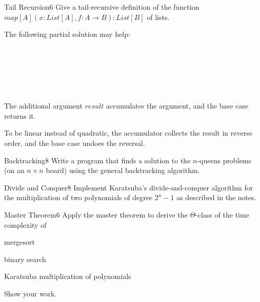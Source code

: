 \documentclass[a4paper]{article}
\begin{document}
\header

\begin{problem}{Tail Recursion}{6}
Give a tail-recursive definition of the function $map[A](x:List[A],f:A\to B):List[B]$ of lists.

The following partial solution may help:
\begin{acode}
\\
\\
\end{acode}


\begin{solution}
\begin{acode}
\\
\\
\end{acode}

The additional argument $result$ accumulates the argument, and the base case returns it.

To be linear instead of quadratic, the accumulator collects the result in reverse order, and the base case undoes the reversal.
\end{solution}
\end{problem}

\begin{problem}{Backtracking}{8}
Write a program that finds a solution to the $n$-queens problems (on an $n\times n$ board) using the general backtracking algorithm.
\end{problem}

\begin{problem}{Divide and Conquer}{8}
Implement Karatsuba's divide-and-conquer algorithm for the multiplication of two polynomials of degree $2^n-1$ as described in the notes.
\end{problem}

\begin{problem}{Master Theorem}{6}
Apply the master theorem to derive the $\Theta$-class of the time complexity of
\begin{compactenum}
  \item mergesort
  \item binary search
  \item Karatsuba multiplication of polynomials
\end{compactenum}
Show your work.
\end{problem}
\end{document}

